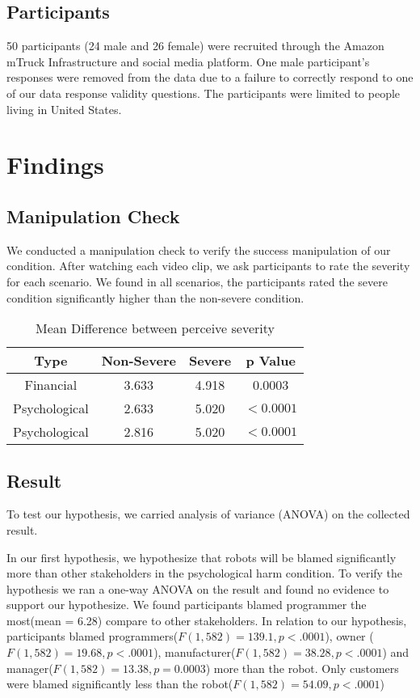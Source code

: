\documentclass{sigchi}
\begin{document}
\subsection{Participants}
50 participants (24 male and 26 female) were recruited through the Amazon mTruck Infrastructure and social media platform. One male participant's responses were removed from the data due to a failure to correctly respond to one of our data response validity questions. The participants were limited to people living in  United States.

\section{Findings}
\subsection{Manipulation Check}
We conducted a manipulation check to verify the success manipulation of our condition. After watching each video clip, we ask participants to rate the severity for each scenario. We found in all scenarios, the participants rated the severe condition significantly higher than the non-severe condition.

\begin{table}
  \centering
  \begin{tabular}{|c|c|c|c|}
    \hline
    Type & Non-Severe & Severe & p Value \\
    \hline
    Financial & 3.633 & 4.918 & 0.0003 \\
    \hline
    Psychological & 2.633 & 5.020 & $ < 0.0001$ \\
    \hline
    Psychological & 2.816 & 5.020 & $ < 0.0001$ \\
    \hline
  \end{tabular}
  \caption{Mean Difference between perceive severity}
  \label{tab:table1}
\end{table}

\subsection{Result}
To test our hypothesis, we carried analysis of variance (ANOVA) on the collected result. 

In our first hypothesis, we hypothesize that robots will be blamed significantly more than other stakeholders in the psychological harm condition. To verify the hypothesis we ran a one-way ANOVA on the result and found no evidence to support our hypothesize. We found participants blamed programmer the most(mean = 6.28) compare to other stakeholders. In relation to our hypothesis, participants blamed programmers($ F(1,582) =139.1, p < .0001$), owner ($ F(1,582) = 19.68, p < .0001$), manufacturer($F(1,582) = 38.28, p < .0001$) and manager($F(1,582) = 13.38, p = 0.0003$) more than the robot. Only customers were blamed significantly less than the robot($F(1,582) = 54.09, p < .0001$)
\end{document}
